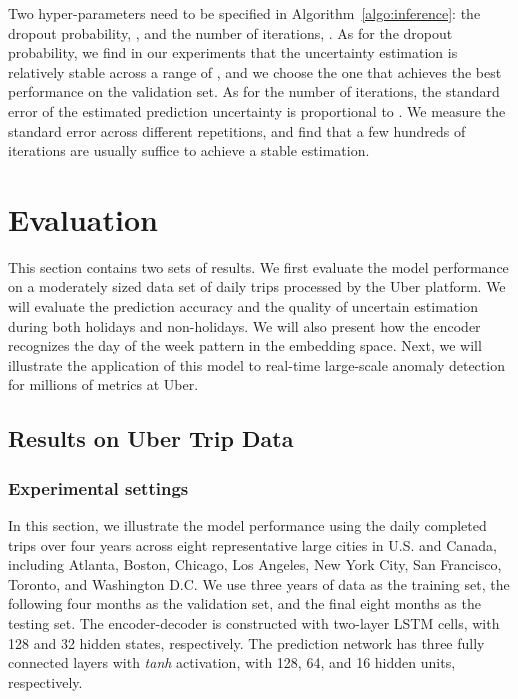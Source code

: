\documentclass[conference,compsoc,final]{IEEEtran}
\begin{document}
Two hyper-parameters need to be specified in Algorithm~\ref{algo:inference}: the dropout probability, , and the number of iterations, . As for the dropout probability, we find in our experiments that the uncertainty estimation is relatively stable across a range of , and we choose the one that achieves the best performance on the validation set. As for the number of iterations, the standard error of the estimated prediction uncertainty is proportional to . We measure the standard error across different repetitions, and find that a few hundreds of iterations are usually suffice to achieve a stable estimation.





 


\section{Evaluation}
\label{sec:evaluation}

This section contains two sets of results. We first evaluate the model performance on a moderately sized data set of daily trips 
processed by the Uber platform.
We will evaluate the prediction accuracy and the quality of uncertain estimation during both holidays and non-holidays. We will also present how the encoder recognizes the day of the week pattern in the embedding space. Next, we will illustrate the application of this model to real-time large-scale anomaly detection for millions of metrics at Uber. 

\subsection{Results on 
Uber 
Trip Data}
\label{sec:trip}

\subsubsection{Experimental settings}
In this section, we illustrate the model performance using the daily completed trips over four years across eight representative large cities in U.S. and Canada, including Atlanta, Boston, Chicago, Los Angeles, New York City,  San Francisco, Toronto, and Washington D.C. We use three years of data as the training set, the following four months as the validation set, and the final eight months as the testing set. The encoder-decoder is constructed with two-layer LSTM cells, with 128 and 32 hidden states, respectively. The prediction network has three fully connected layers with {\it tanh} activation, with 128, 64, and 16 hidden units, respectively.
\end{document}
